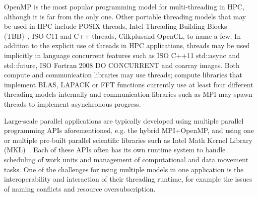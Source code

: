 
OpenMP is the most popular programming model for multi-threading in HPC,
although it is far from the only one.
Other portable threading models that may be used in HPC include
POSIX threads,
Intel\regtm{} Threading Building Blocks (TBB)~\cite{pheatt2008intel},
ISO C11 and C++ threads, Cilkplus\tm and
OpenCL\tm, to name a few. 
In addition to the explicit use of threads in HPC applications,
threads may be used implicitly in language concurrent features such as
ISO C++11 {\sf std::async} and {\sf std::future},
ISO Fortran 2008 {\sf DO CONCURRENT} and coarray images.
Both compute and communication libraries may use threads;
compute libraries that implement BLAS, LAPACK or FFT functions
currently use at least four different threading models internally and
communication libraries such as MPI may spawn threads to implement asynchronous progress.

Large-scale parallel applications are typically developed using multiple parallel programming APIs 
aforementioned, e.g. the hybrid MPI+OpenMP, and using one or multiple pre-built parallel scientific
libraries such as Intel Math Kernel Library (MKL)~\cite{wang2014intel}.
Each of these APIs often has its own runtime system to handle scheduling of work units 
and management of computational and data movement tasks. 
One of the challenges for using multiple models in one application is the interoperability and
interaction of their threading runtime, for example the issues of naming conflicts and resource
oversubscription. 

